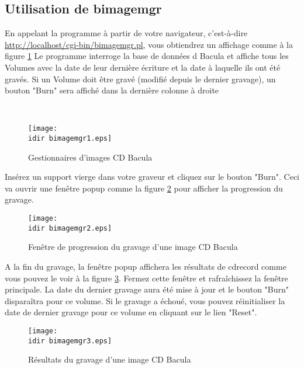 \subsection{Utilisation de bimagemgr}

En appelant la programme à partir de votre navigateur, c'est-à-dire  
\url{http://localhost/cgi-bin/bimagemgr.pl}, vous obtiendrez un affichage comme
à la figure \ref{fig:baculacdimagemanager}
Le programme interroge la base de données d Bacula et affiche tous les Volumes
avec la date de leur dernière écriture et la date à laquelle ils ont été gravés.
Si un Volume doit être gravé (modifié depuis le dernier gravage), un bouton
"Burn" sera affiché dans la dernière colonne à droite

\vfill
~

\begin{figure}[H]
\texttt{[image: \\idir bimagemgr1.eps]} 
\caption{\label{fig:baculacdimagemanager}Gestionnaires d'images CD Bacula}
\end{figure}

Insérez un support vierge dans votre graveur et cliquez sur le bouton "Burn".
Ceci va ouvrir une fenêtre popup comme la figure 
\ref{fig:baculacdimageburnprogress} pour afficher la progression du gravage. 


\begin{figure}[H]
\texttt{[image: \\idir bimagemgr2.eps]} 
\caption{\label{fig:baculacdimageburnprogress}Fenêtre de progression du gravage 
d'une image CD Bacula}
\end{figure}

A la fin du gravage, la fenêtre popup affichera les résultats de cdrecord comme
vous pouvez le voir à la figure \ref{fig:baculacdimageburnresults}. Fermez cette
fenêtre et rafraîchissez la fenêtre principale. La date du dernier gravage aura
été mise à jour et le bouton "Burn" disparaîtra pour ce volume. Si le gravage a 
échoué, vous pouvez réinitialiser la date de dernier gravage pour ce volume en
cliquant sur le lien "Reset". 

\begin{figure}[H]
\texttt{[image: \\idir bimagemgr3.eps]} 
\caption{\label{fig:baculacdimageburnresults}Résultats du gravage d'une image CD
Bacula}
\end{figure}

